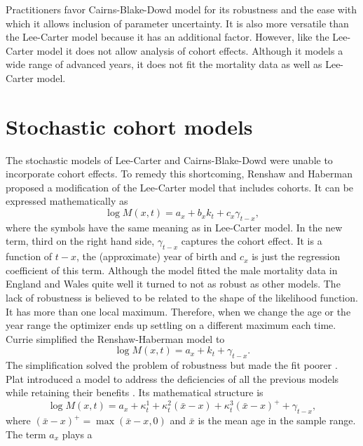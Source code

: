 \documentclass{article}
\numberwithin{equation}{section}
\begin{document}
Practitioners favor Cairns-Blake-Dowd model for its robustness and the ease
with which it allows inclusion of parameter uncertainty. It is also more 
versatile than the Lee-Carter model because it has an additional factor. 
However, like the Lee-Carter model it does not allow analysis of cohort effects.
Although it models a wide range of advanced years, it does not fit the 
mortality data as well as Lee-Carter model.

\section{Stochastic cohort models}\label{s9}
The stochastic models of Lee-Carter and Cairns-Blake-Dowd were unable to
incorporate cohort effects. To remedy this shortcoming, Renshaw and Haberman
\cite{renshaw2006cohort} proposed a modification of the Lee-Carter model that 
includes cohorts. It can be expressed mathematically as
\begin{equation}\label{s9e1}
\log{M}(x, t) = {a}_x + {b}_x{k}_t + {c}_x\gamma_{t-x},
\end{equation}
where the symbols have the same meaning as in Lee-Carter model. In the new
term, third on the right hand side, $\gamma_{t-x}$ captures the cohort effect.
It is a function of $t - x$, the (approximate) year of birth and ${c}_x$
is just the regression coefficient of this term. Although the model fitted the
male mortality data in England and Wales quite well it turned to not as 
robust as other models. The lack of robustness is believed to be related to
the shape of the likelihood function. It has more than one local maximum.
Therefore, when we change the age or the year range the optimizer ends up
settling on a different maximum each time\cite{cairns2008modelling}. Currie
simplified the Renshaw-Haberman model to
\begin{equation}\label{s9e2}
\log{M}(x, t) = {a}_x + {k}_t + \gamma_{t-x}.
\end{equation}
The simplification solved the problem of robustness but made the fit poorer
\cite{plat2009stochastic}. Plat introduced a model to address the deficiencies
of all the previous models while retaining their benefits 
\cite{plat2009stochastic}. Its mathematical structure is
\begin{equation}\label{s9e3}
\log M(x,t) = a_x + \kappa^1_t + \kappa^2_t(\bar{x} - x) + 
\kappa^3_t(\bar{x} - x)^+ + \gamma_{t-x},
\end{equation}
where $(\bar{x} - x)^+ = \max(\bar{x} - x, 0)$ and $\bar{x}$ is the mean age
in the sample range. The term $a_x$ plays a 
\end{document}
